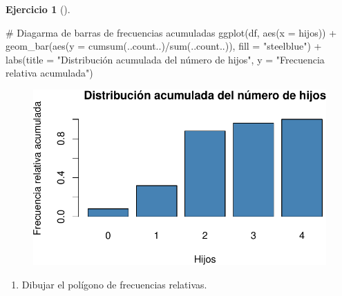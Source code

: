 \documentclass[
  a4paper,
]{scrreport}
\newenvironment{Shaded}{\begin{snugshade}}{\end{snugshade}}
\newcommand{\AttributeTok}[1]{\textcolor[rgb]{0.40,0.45,0.13}{#1}}
\newcommand{\CommentTok}[1]{\textcolor[rgb]{0.37,0.37,0.37}{#1}}
\newcommand{\FunctionTok}[1]{\textcolor[rgb]{0.28,0.35,0.67}{#1}}
\newcommand{\NormalTok}[1]{\textcolor[rgb]{0.00,0.23,0.31}{#1}}
\newcommand{\SpecialCharTok}[1]{\textcolor[rgb]{0.37,0.37,0.37}{#1}}
\newcommand{\StringTok}[1]{\textcolor[rgb]{0.13,0.47,0.30}{#1}}
\providecommand{\tightlist}{%
  \setlength{\itemsep}{0pt}\setlength{\parskip}{0pt}}\usepackage{longtable,booktabs,array}
\theoremstyle{definition}
\newtheorem{exercise}{Ejercicio}[chapter]
\theoremstyle{remark}
\begin{document}
\begin{exercise}[]
\begin{tcolorbox}
\begin{figure}[H]
{}

\end{figure}

\begin{Shaded}
\begin{Highlighting}[]
\CommentTok{\# Diagarma de barras de frecuencias acumuladas}
\FunctionTok{ggplot}\NormalTok{(df, }\FunctionTok{aes}\NormalTok{(}\AttributeTok{x =}\NormalTok{ hijos)) }\SpecialCharTok{+}
    \FunctionTok{geom\_bar}\NormalTok{(}\FunctionTok{aes}\NormalTok{(}\AttributeTok{y =} \FunctionTok{cumsum}\NormalTok{(..count..)}\SpecialCharTok{/}\FunctionTok{sum}\NormalTok{(..count..)), }\AttributeTok{fill =} \StringTok{"steelblue"}\NormalTok{) }\SpecialCharTok{+}
    \FunctionTok{labs}\NormalTok{(}\AttributeTok{title =} \StringTok{"Distribución acumulada del número de hijos"}\NormalTok{, }\AttributeTok{y =} \StringTok{"Frecuencia relativa acumulada"}\NormalTok{)}
\end{Highlighting}
\end{Shaded}

\begin{figure}[H]

{\centering \includegraphics{./03-frecuencias-graficos_files/figure-pdf/unnamed-chunk-6-4.pdf}

}

\end{figure}

\end{tcolorbox}

\begin{enumerate}
\def\labelenumi{\alph{enumi}.}
\setcounter{enumi}{3}
\tightlist
\item
  Dibujar el polígono de frecuencias relativas.
\end{enumerate}


\end{exercise}
\end{document}
